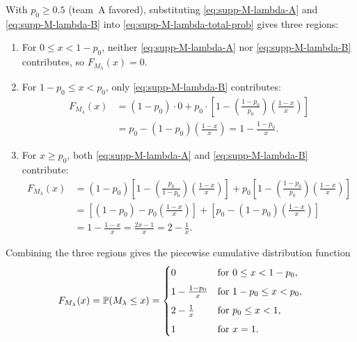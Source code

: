 With $p_0 \ge 0.5$ (team~A favored), substituting \eqref{eq:supp-M-lambda-A} and \eqref{eq:supp-M-lambda-B} into \eqref{eq:supp-M-lambda-total-prob} gives three regions:
\begin{enumerate}[leftmargin=*]
    \item For $0 \le x < 1-p_0$, neither \eqref{eq:supp-M-lambda-A} nor \eqref{eq:supp-M-lambda-B} contributes, so $F_{M_\lambda}(x) = 0$.

    \item For $1-p_0 \le x < p_0$, only \eqref{eq:supp-M-lambda-B} contributes:
    \begin{align*}
        F_{M_\lambda}(x) &= (1-p_0) \cdot 0 + p_0 \cdot \left[1 - \left(\frac{1-p_0}{p_0}\right) \left(\frac{1-x}{x}\right)\right] \\
        &= p_0 - (1-p_0)\left(\frac{1-x}{x}\right) = 1 - \frac{1-p_0}{x}.
    \end{align*}

    \item For $x \ge p_0$, both \eqref{eq:supp-M-lambda-A} and \eqref{eq:supp-M-lambda-B} contribute:
    \begin{align*}
        F_{M_\lambda}(x) &= (1-p_0)\left[1 - \left(\frac{p_0}{1-p_0}\right) \left(\frac{1-x}{x}\right)\right] + p_0\left[1 - \left(\frac{1-p_0}{p_0}\right) \left(\frac{1-x}{x}\right)\right] \\
        &= \left[(1-p_0) - p_0\left(\frac{1-x}{x}\right)\right] + \left[p_0 - (1-p_0)\left(\frac{1-x}{x}\right)\right] \\
        &= 1 - \frac{1-x}{x} = \frac{2x-1}{x} = 2 - \frac{1}{x}.
    \end{align*}
\end{enumerate}

Combining the three regions gives the piecewise cumulative distribution function
\begin{equation*}
    F_{M_\lambda}(x) = \P(M_\lambda \le x) = \begin{cases}
        0 & \text{for } 0 \le x < 1-p_0, \\[0.5em]
        1 - \frac{1-p_0}{x} & \text{for } 1-p_0 \le x < p_0, \\[0.5em]
        2 - \frac{1}{x} & \text{for } p_0 \le x < 1, \\[0.5em]
        1 & \text{for } x = 1.
    \end{cases}
\end{equation*}
